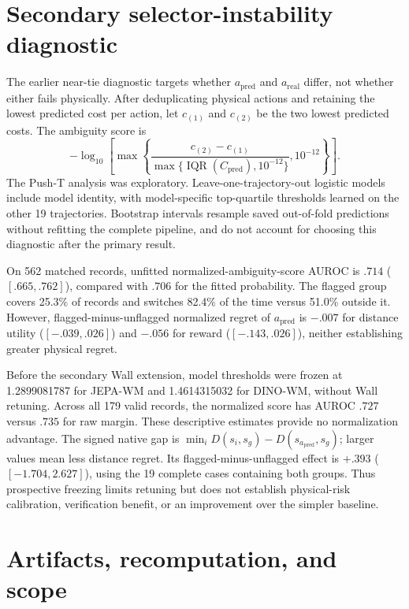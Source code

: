 \documentclass{article}
\begin{document}
\section{Secondary selector-instability diagnostic}
\label{app:neartie}

The earlier near-tie diagnostic targets whether $a_{\mathrm{pred}}$ and
$a_{\mathrm{real}}$ differ, not whether either fails physically. After
deduplicating physical actions and retaining the lowest predicted cost per
action, let $c_{(1)}$ and $c_{(2)}$ be the two lowest predicted costs.
The ambiguity score is
\begin{equation}
 -\log_{10}\!\left[\max\!\left\{
 \frac{c_{(2)}-c_{(1)}}{\max\{\operatorname{IQR}(C_{\mathrm{pred}}),10^{-12}\}},
 10^{-12}\right\}\right].
\end{equation}
The Push-T analysis was exploratory. Leave-one-trajectory-out logistic models
include model identity, with model-specific top-quartile thresholds learned
on the other 19 trajectories. Bootstrap intervals resample saved out-of-fold
predictions without refitting the complete pipeline, and do not account for
choosing this diagnostic after the primary result.

On 562 matched records, unfitted normalized-ambiguity-score AUROC is $.714$ ($[.665,.762]$), compared
with $.706$ for the fitted probability. The flagged group covers 25.3\% of
records and switches 82.4\% of the time versus 51.0\% outside it. However,
flagged-minus-unflagged normalized regret of $a_{\mathrm{pred}}$ is $-.007$ for distance utility
($[-.039,.026]$) and $-.056$ for reward ($[-.143,.026]$), neither establishing
greater physical regret.

Before the secondary Wall extension, model thresholds were frozen at
1.2899081787 for JEPA-WM and 1.4614315032 for DINO-WM, without Wall retuning.
Across all 179 valid records, the normalized score has AUROC $.727$ versus
$.735$ for raw margin. These descriptive estimates provide no normalization
advantage. The signed native gap is
$\min_iD(s_i,s_g)-D(s_{a_{\mathrm{pred}}},s_g)$; larger values mean less distance regret.
Its flagged-minus-unflagged effect is $+.393$
($[-1.704,2.627]$), using the 19 complete cases containing both groups.
Thus prospective freezing limits retuning but does not establish physical-risk
calibration, verification benefit, or an improvement over the simpler baseline.

\section{Artifacts, recomputation, and scope}
\label{app:repro}
\end{document}
